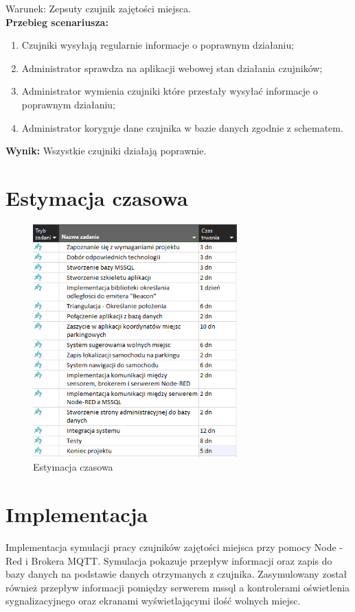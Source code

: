 \documentclass[12pt,a4paper]{article}
\begin{document}
Warunek: Zepsuty czujnik zajętości miejsca.
\\{\bf Przebieg scenariusza:}
\begin{enumerate}
\item Czujniki wysyłają regularnie informacje o poprawnym działaniu;
\item Administrator sprawdza na aplikacji webowej stan działania czujników;
\item Administrator wymienia czujniki które przestały wysyłać informacje o poprawnym działaniu;
\item Administrator koryguje dane czujnika w bazie danych zgodnie z schematem.
\end{enumerate}
{\bf Wynik:} Wszystkie czujniki działają poprawnie.



\newpage

\section{Estymacja czasowa}
\begin{figure}[htb!p]
\begin{center}
\includegraphics[width=0.7\textwidth]{unknown.png}
\caption{Estymacja czasowa}
\end{center}
\end{figure}

\section{Implementacja}
	Implementacja  symulacji pracy czujników zajętości miejsca przy pomocy Node -Red i Brokera MQTT. Symulacja  pokazuje przepływ informacji oraz zapis do bazy danych na podstawie danych otrzymanych z czujnika. Zasymulowany został również  przepływ informacji pomiędzy  serwerem mssql a kontrolerami oświetlenia sygnalizacyjnego oraz ekranami wyświetlającymi ilość wolnych miejsc.
\end{document}
